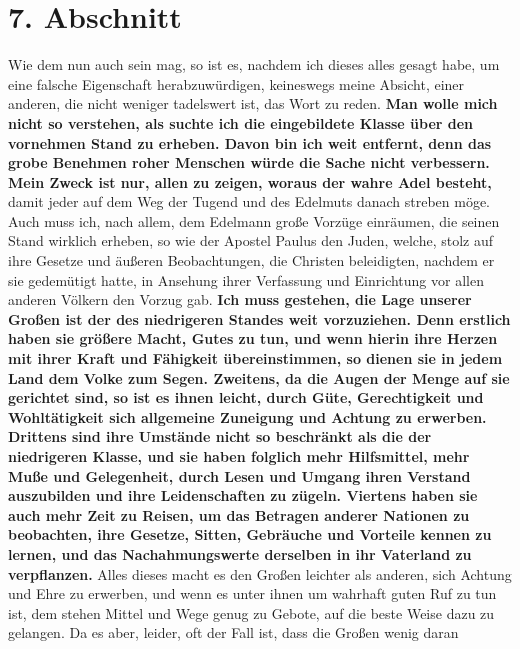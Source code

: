 \section{7. Abschnitt} \label{kap11_ab7}

Wie dem nun auch sein mag, so ist es, nachdem ich dieses alles gesagt habe, um
eine falsche Eigenschaft herabzuwürdigen, keineswegs meine Absicht, einer
anderen, die nicht weniger tadelswert ist, das Wort zu reden. \textbf{Man wolle
mich
nicht so verstehen, als suchte ich die eingebildete
Klasse über den vornehmen
Stand zu erheben. Davon bin ich weit entfernt, denn das grobe
Benehmen roher
Menschen würde die Sache nicht verbessern. Mein Zweck ist nur, allen zu zeigen,
woraus der wahre Adel besteht,} damit jeder auf dem Weg der Tugend und des
Edelmuts danach streben möge. Auch muss ich, nach allem, dem Edelmann große
Vorzüge einräumen, die seinen Stand wirklich erheben, so wie der Apostel
Paulus
den Juden, welche, stolz auf ihre Gesetze und äußeren
Beobachtungen, die Christen
beleidigten, nachdem er sie gedemütigt hatte, in Ansehung ihrer Verfassung und
Einrichtung vor allen anderen Völkern den Vorzug gab.
\label{ref:11_07_standesvorteil} \textbf{Ich muss gestehen, die Lage
unserer Großen ist der des
niedrigeren
Standes weit vorzuziehen. Denn erstlich
haben sie größere Macht, Gutes zu tun, und wenn hierin ihre Herzen mit ihrer
Kraft und Fähigkeit übereinstimmen, so dienen sie in jedem Land dem Volke zum
Segen. Zweitens, da die Augen der Menge auf sie gerichtet sind, so ist es ihnen
leicht, durch Güte, Gerechtigkeit und Wohltätigkeit sich
allgemeine Zuneigung
und Achtung zu erwerben. Drittens sind ihre Umstände nicht so beschränkt als die
der niedrigeren Klasse, und sie haben folglich mehr Hilfsmittel, mehr
Muße und
Gelegenheit, durch Lesen und Umgang ihren Verstand
auszubilden und ihre
Leidenschaften zu zügeln. Viertens haben sie auch mehr Zeit zu
Reisen, um das
Betragen anderer Nationen zu beobachten, ihre Gesetze, Sitten, Gebräuche und
Vorteile kennen zu lernen, und das Nachahmungswerte derselben in ihr Vaterland
zu verpflanzen.} Alles dieses macht es den Großen leichter als anderen, sich
Achtung und Ehre zu erwerben, und wenn es unter ihnen um wahrhaft guten Ruf zu
tun ist, dem stehen Mittel und Wege genug zu Gebote, auf die beste Weise dazu
zu gelangen. Da es aber, leider, oft der Fall ist, dass die Großen wenig daran

